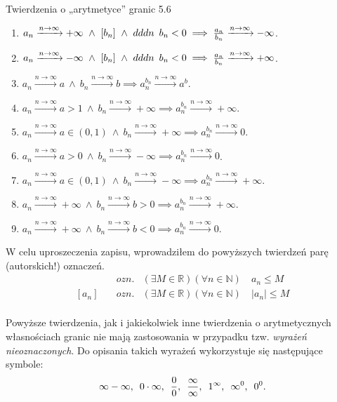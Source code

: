 \documentclass{article}
\newcommand{\hquad}{\mkern9mu}
\newcommand{\R}{\mathbb{R}}
\newcommand{\N}{\mathbb{N}}
\newcommand{\arn}{\xrightarrow{n\to\infty}}
\begin{document}
\begin{twier}{Twierdzenia o „arytmetyce” granic 5.6}
\begin{enumerate}[label=(\arabic*)]
        \item $a_n\arn+\infty\ \land\ [b_n]\ \land\ dddn\hquad b_n<0\implies \frac{a_n}{b_n}\arn-\infty$.
        \item $a_n\arn-\infty\ \land\ [b_n]\ \land\ dddn\hquad b_n<0\implies \frac{a_n}{b_n}\arn+\infty$.
        \item $a_n\arn a\ \land\ b_n\arn b\implies a_n^{b_n}\arn a^b$.
        \item $a_n\arn a>1\ \land\ b_n\arn +\infty\implies a_n^{b_n}\arn +\infty$.
        \item $a_n\arn a\in(0,1)\ \land\ b_n\arn +\infty\implies a_n^{b_n}\arn 0$.
        \item $a_n\arn a>0\ \land\ b_n\arn -\infty\implies a_n^{b_n}\arn 0$.
        \item $a_n\arn a\in(0,1)\ \land\ b_n\arn -\infty\implies a_n^{b_n}\arn +\infty$.
        \item $a_n\arn +\infty\ \land\ b_n\arn b>0\implies a_n^{b_n}\arn +\infty$.
        \item $a_n\arn +\infty\ \land\ b_n\arn b<0\implies a_n^{b_n}\arn 0$.
    \end{enumerate}
\end{twier}

W celu uproszeczenia zapisu, wprowadziłem do powyższych twierdzeń parę (autorskich!) oznaczeń.
\begin{align*}
    [a_n\quad &ozn. &(\exists m\in\R)(\forall n\in\N)\ &a_n\ge m\\
    a_n]\quad &ozn. &(\exists M\in\R)(\forall n\in\N)\ &a_n\le M\\
    [a_n]\quad &ozn. &(\exists M\in\R)(\forall n\in\N)\ &|a_n|\le M\\
\end{align*}

Powyższe twierdzenia, jak i jakiekolwiek inne twierdzenia o arytmetycznych własnościach
granic nie mają zastosowania w przypadku tzw. \textit{wyrażeń nieoznaczonych}.
Do opisania takich wyrażeń wykorzystuje się następujące symbole:
\begin{equation*}
\infty -\infty  ,\hquad 0\cdot\infty,\hquad \frac{0}{0},\hquad \frac{\infty}{\infty},
\hquad 1^{\infty},\hquad \infty^{0},\hquad 0^0.  
\end{equation*}
\end{document}
